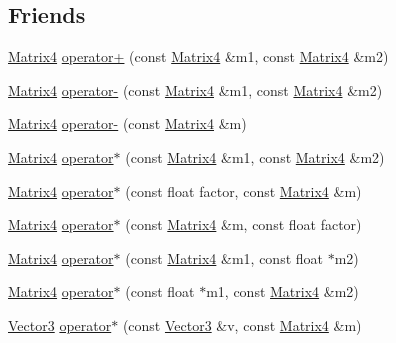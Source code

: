 \subsection*{Friends}
\begin{DoxyCompactItemize}
\item 
\hyperlink{classprism_1_1_matrix4}{Matrix4} \hyperlink{classprism_1_1_matrix4_afc2bce19b13471f0cac1a48c2932af60}{operator+} (const \hyperlink{classprism_1_1_matrix4}{Matrix4} \&m1, const \hyperlink{classprism_1_1_matrix4}{Matrix4} \&m2)
\item 
\hyperlink{classprism_1_1_matrix4}{Matrix4} \hyperlink{classprism_1_1_matrix4_a2e7720348e3d34cad4119b93c499971e}{operator-\/} (const \hyperlink{classprism_1_1_matrix4}{Matrix4} \&m1, const \hyperlink{classprism_1_1_matrix4}{Matrix4} \&m2)
\item 
\hyperlink{classprism_1_1_matrix4}{Matrix4} \hyperlink{classprism_1_1_matrix4_a9d189e964a989207c8489e80276dadd4}{operator-\/} (const \hyperlink{classprism_1_1_matrix4}{Matrix4} \&m)
\item 
\hyperlink{classprism_1_1_matrix4}{Matrix4} \hyperlink{classprism_1_1_matrix4_af33d4af5371e50d645cd647e02912f28}{operator$\ast$} (const \hyperlink{classprism_1_1_matrix4}{Matrix4} \&m1, const \hyperlink{classprism_1_1_matrix4}{Matrix4} \&m2)
\item 
\hyperlink{classprism_1_1_matrix4}{Matrix4} \hyperlink{classprism_1_1_matrix4_aefe58d9157e2f7ac266b357a5db4e986}{operator$\ast$} (const float factor, const \hyperlink{classprism_1_1_matrix4}{Matrix4} \&m)
\item 
\hyperlink{classprism_1_1_matrix4}{Matrix4} \hyperlink{classprism_1_1_matrix4_aeec24c93fae98db6ade9c1dd738ef3e7}{operator$\ast$} (const \hyperlink{classprism_1_1_matrix4}{Matrix4} \&m, const float factor)
\item 
\hyperlink{classprism_1_1_matrix4}{Matrix4} \hyperlink{classprism_1_1_matrix4_a023b29b55ee669aa94f8bbc9131923ce}{operator$\ast$} (const \hyperlink{classprism_1_1_matrix4}{Matrix4} \&m1, const float $\ast$m2)
\item 
\hyperlink{classprism_1_1_matrix4}{Matrix4} \hyperlink{classprism_1_1_matrix4_a26ce7e4aed9bc5780ebb8411acce6583}{operator$\ast$} (const float $\ast$m1, const \hyperlink{classprism_1_1_matrix4}{Matrix4} \&m2)
\item 
\hyperlink{classprism_1_1_vector3}{Vector3} \hyperlink{classprism_1_1_matrix4_ada37b2462427325427c6503a1a370d40}{operator$\ast$} (const \hyperlink{classprism_1_1_vector3}{Vector3} \&v, const \hyperlink{classprism_1_1_matrix4}{Matrix4} \&m)

\end{DoxyCompactItemize}
